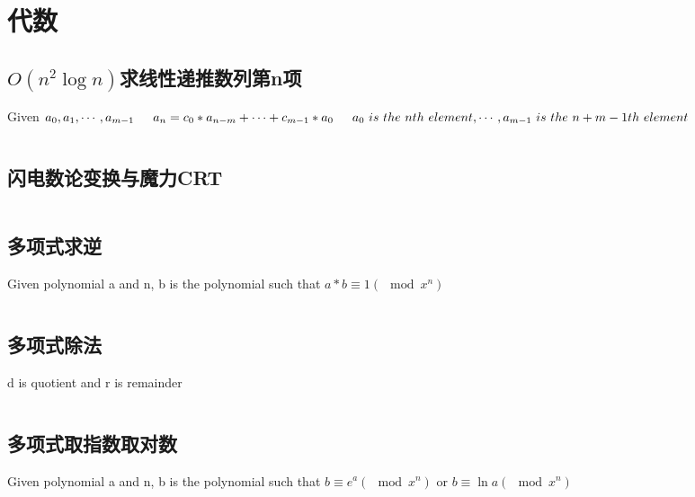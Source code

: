 \chapter{代数}
\section{$O(n^2\log n)$求线性递推数列第n项}
Given $a_0, a_1, \cdots , a_{m-1} \\
\indent a_n = c_0 * a_{n-m} + \cdots + c_{m-1} * a_0 \\
\indent a_0 \ is \ the \ nth \ element, \cdots, a_{m-1} \ is \ the \ n+m-1th \ element
$
\inputminted{cpp}{\source/algebra/linear-recursion.cpp}
\section{闪电数论变换与魔力CRT}
\inputminted{cpp}{\source/algebra/NTT+CRT.cpp}
\section{多项式求逆}
Given polynomial a and n, b is the polynomial such that $a * b \equiv 1 (\mod x^n) $
\inputminted{cpp}{\source/algebra/polynomial-inverse.cpp}
\section{多项式除法}
d is quotient and r is remainder
\inputminted{cpp}{\source/algebra/polynomial-divide.cpp}
\section{多项式取指数取对数}
Given polynomial a and n, b is the polynomial such that $b \equiv e^a (\mod x^n)$ or $b \equiv \ln a (\mod x^n)$
\inputminted{cpp}{\source/algebra/polynomial-expandln.cpp}